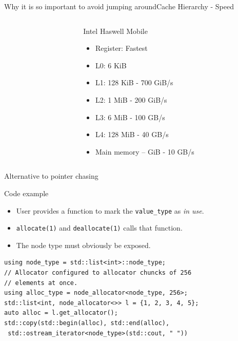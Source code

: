 \documentclass[10pt,aspectratio=169]{beamer}
\begin{document}
\begin{frame}{Why it is so important to avoid jumping around}{Cache Hierarchy - Speed}
\begin{columns}
\begin{column}{0.33\textwidth}
        \end{column}

        \begin{column}{0.3\textwidth}
            Intel Haswell Mobile 
            \begin{itemize}
                \item Register: Fastest
                \item L0: 6 KiB
                \item L1: 128 KiB - 700 GiB/s
                \item L2: 1 MiB - 200 GiB/s
                \item L3: 6 MiB - 100 GB/s
                \item L4: 128 MiB - 40 GB/s
                \item Main memory – GiB - 10 GB/s
            \end{itemize}
        \end{column}

    \end{columns}
\end{frame}

\begin{frame}[fragile]{Alternative to pointer chasing}
\begin{block} {Code example}
\begin{itemize}
\item User provides a function to mark the \texttt{value\_type}
as {\it in use}.
\item \texttt{allocate(1)} and \texttt{deallocate(1)} calls that 
function.
\item The node type must obviously be exposed.
\end{itemize}
\end{block}

\begin{lstlisting}
using node_type = std::list<int>::node_type;
// Allocator configured to allocator chuncks of 256
// elements at once.
using alloc_type = node_allocator<node_type, 256>;
std::list<int, node_allocator<>> l = {1, 2, 3, 4, 5};
auto alloc = l.get_allocator();
std::copy(std::begin(alloc), std::end(alloc),
 std::ostream_iterator<node_type>(std::cout, " "))
\end{lstlisting}

\end{frame}
\end{document}

